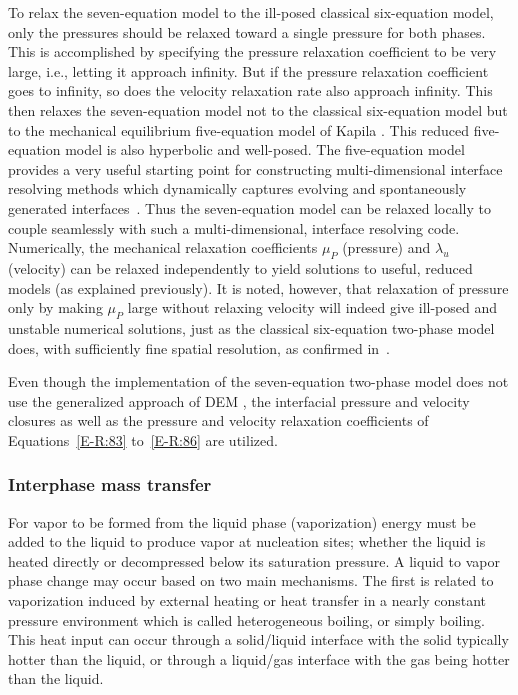 To relax the seven-equation model to
the ill-posed classical six-equation model, only the pressures should be
relaxed toward a single pressure for both phases.  This is
accomplished by specifying the pressure relaxation coefficient to be
very large, i.e., letting it approach infinity.  But if the pressure
relaxation coefficient goes to infinity, so does the velocity
relaxation rate also approach infinity.  This then relaxes the
seven-equation model not to the classical six-equation model but to the
mechanical equilibrium five-equation model of Kapila \cite{Kapila_2001}.  This reduced
five-equation model is also hyperbolic and well-posed. The five-equation
model provides a very useful starting point for constructing
multi-dimensional interface resolving methods which dynamically
captures evolving and spontaneously generated
interfaces~\cite{Saurel_2009}. Thus the seven-equation model
can be relaxed locally to couple seamlessly with such a
multi-dimensional, interface resolving code.
\newpage
Numerically, the mechanical relaxation coefficients $\mu_P$
(pressure) and $\lambda_u$ (velocity) can be relaxed independently to
yield solutions to useful, reduced models (as explained previously).  It
is noted, however, that relaxation of pressure only by making $\mu_P$
large without relaxing velocity will indeed give ill-posed and
unstable numerical solutions, just as the classical six-equation
two-phase model does, with sufficiently fine spatial resolution, as
confirmed in~\cite{SEM,Herrard_2005}.

Even though the implementation of the seven-equation two-phase
model does not use
the generalized approach of DEM \cite{SEM}, the interfacial pressure and velocity
closures as well as the pressure and velocity relaxation coefficients
of Equations~\eqref{E-R:83} to~\eqref{E-R:86} are utilized.
\subsubsection{Interphase mass transfer}
For vapor to be formed from the liquid phase (vaporization) energy
must be added to the liquid to produce vapor at nucleation sites;
whether the liquid is heated directly or decompressed below its
saturation pressure.  A liquid to vapor phase change may occur based
on two main mechanisms.  The first is related to vaporization induced
by external heating or heat transfer in a nearly constant pressure
environment which is called heterogeneous boiling, or simply
boiling.  This heat input can occur through a solid/liquid
interface with the solid typically hotter than the liquid, or through
a liquid/gas interface with the gas being hotter than the liquid.

